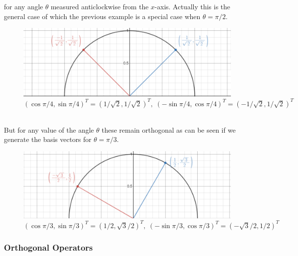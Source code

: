 \documentclass[MathsNotesBase.tex]{subfiles}
\begin{document}
{			for any angle $\theta$ measured anticlockwise from the $x$-axis. Actually this is the general case of which the previous example is a special case when ${ \theta = \pi / 2 }$.			
			\begin{figure}[h!]
				\includegraphics[width=\linewidth]{resources/img/orthonormal_bases_theta_pi_by_2.png}
				\caption{$ (\cos{\pi/4}, \sin{\pi/4})^T = (1/\sqrt{2}, 1/\sqrt{2})^T,\;  (-\sin{\pi/4}, \cos{\pi/4})^T = (-1/\sqrt{2}, 1/\sqrt{2})^T $}
			\end{figure}
			\\But for any value of the angle $\theta$ these remain orthogonal as can be seen if we generate the basis vectors for ${ \theta = \pi/3 }$.
			\begin{figure}[h!]
				\includegraphics[width=\linewidth]{resources/img/orthonormal_bases_theta_pi_by_3.png}
				\caption{$ (\cos{\pi/3}, \sin{\pi/3})^T = (1/2, \sqrt{3}/2)^T,\;  (-\sin{\pi/3}, \cos{\pi/3})^T = (-\sqrt{3}/2, 1/2)^T $}
			\end{figure}
	
		
		\bigskip\bigskip
		\subsubsection{Orthogonal Operators}
		\bigskip
	
}
\end{document}
